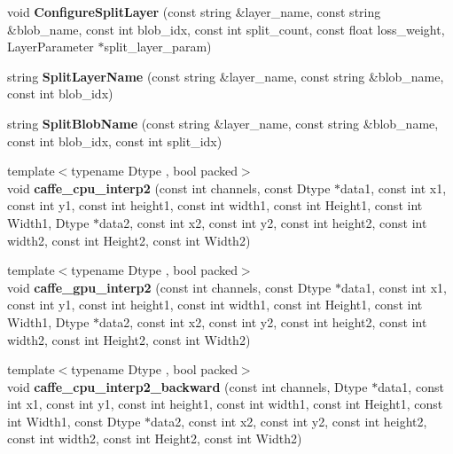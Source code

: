 \begin{DoxyCompactItemize}
\item 
void {\bfseries Configure\+Split\+Layer} (const string \&layer\+\_\+name, const string \&blob\+\_\+name, const int blob\+\_\+idx, const int split\+\_\+count, const float loss\+\_\+weight, Layer\+Parameter $\ast$split\+\_\+layer\+\_\+param)\hypertarget{namespacecaffe_a5a48192f21125085d45dbcc0d047362b}{}\label{namespacecaffe_a5a48192f21125085d45dbcc0d047362b}

\item 
string {\bfseries Split\+Layer\+Name} (const string \&layer\+\_\+name, const string \&blob\+\_\+name, const int blob\+\_\+idx)\hypertarget{namespacecaffe_a474555bb59481bf56abf5982dc5f7cd5}{}\label{namespacecaffe_a474555bb59481bf56abf5982dc5f7cd5}

\item 
string {\bfseries Split\+Blob\+Name} (const string \&layer\+\_\+name, const string \&blob\+\_\+name, const int blob\+\_\+idx, const int split\+\_\+idx)\hypertarget{namespacecaffe_ab4227137f8f8a1a442cb9be8493df381}{}\label{namespacecaffe_ab4227137f8f8a1a442cb9be8493df381}

\item 
{\footnotesize template$<$typename Dtype , bool packed$>$ }\\void {\bfseries caffe\+\_\+cpu\+\_\+interp2} (const int channels, const Dtype $\ast$data1, const int x1, const int y1, const int height1, const int width1, const int Height1, const int Width1, Dtype $\ast$data2, const int x2, const int y2, const int height2, const int width2, const int Height2, const int Width2)\hypertarget{namespacecaffe_ae5a7b6a0dcb789edea441189e02ec4a1}{}\label{namespacecaffe_ae5a7b6a0dcb789edea441189e02ec4a1}

\item 
{\footnotesize template$<$typename Dtype , bool packed$>$ }\\void {\bfseries caffe\+\_\+gpu\+\_\+interp2} (const int channels, const Dtype $\ast$data1, const int x1, const int y1, const int height1, const int width1, const int Height1, const int Width1, Dtype $\ast$data2, const int x2, const int y2, const int height2, const int width2, const int Height2, const int Width2)\hypertarget{namespacecaffe_afca53d54fbe67bd85f739a8cab68962c}{}\label{namespacecaffe_afca53d54fbe67bd85f739a8cab68962c}

\item 
{\footnotesize template$<$typename Dtype , bool packed$>$ }\\void {\bfseries caffe\+\_\+cpu\+\_\+interp2\+\_\+backward} (const int channels, Dtype $\ast$data1, const int x1, const int y1, const int height1, const int width1, const int Height1, const int Width1, const Dtype $\ast$data2, const int x2, const int y2, const int height2, const int width2, const int Height2, const int Width2)\hypertarget{namespacecaffe_a191f7f9a18fcdbff216f2c5497c9e8ce}{}\label{namespacecaffe_a191f7f9a18fcdbff216f2c5497c9e8ce}


\end{DoxyCompactItemize}

